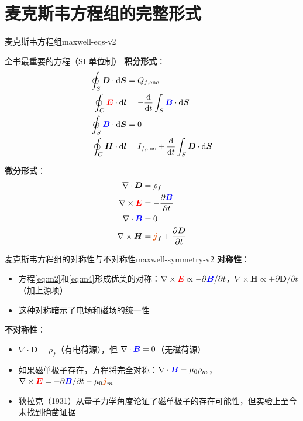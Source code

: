 \documentclass[11pt,a4paper,openany,oneside]{book}
\newcommand{\diff}{\mathrm{d}}
\newcommand{\vecE}{\textcolor{red}{\vect{E}}}
\newcommand{\vecB}{\textcolor{blue}{\vect{B}}}
\newcommand{\vecJ}{\textcolor{cororange}{\vect{j}}}
\newcommand{\vect}[1]{\bm{#1}}
\newcommand{\curl}{\nabla\times}
\newcommand{\divg}{\nabla\cdot}
\begin{document}
\section{麦克斯韦方程组的完整形式}

\begin{theorem}{麦克斯韦方程组}{maxwell-eqs-v2}
\begin{impEqbox}{全书最重要的方程（SI 单位制）}
\textbf{积分形式}：
\begin{align}
\oint_S \vect{D} \cdot \diff\vect{S} &= Q_{f,\text{enc}} \label{eq:M1} \\
\oint_C \vecE \cdot \diff\vect{l} &= -\frac{\diff}{\diff t}\int_S \vecB\cdot\diff\vect{S} \label{eq:M2} \\
\oint_S \vecB \cdot \diff\vect{S} &= 0 \label{eq:M3} \\
\oint_C \vect{H} \cdot \diff\vect{l} &= I_{f,\text{enc}} + \frac{\diff}{\diff t}\int_S \vect{D}\cdot\diff\vect{S} \label{eq:M4}
\end{align}

\textbf{微分形式}：
\begin{align}
\divg\vect{D} &= \rho_f \label{eq:m1} \\
\curl\vecE &= -\frac{\partial\vecB}{\partial t} \label{eq:m2} \\
\divg\vecB &= 0 \label{eq:m3} \\
\curl\vect{H} &= \vecJ_f + \frac{\partial\vect{D}}{\partial t} \label{eq:m4}
\end{align}
\end{impEqbox}
\end{theorem}

\begin{insight}{麦克斯韦方程组的对称性与不对称性}{maxwell-symmetry-v2}
\textbf{对称性}：
\begin{itemize}
\item 方程\eqref{eq:m2}和\eqref{eq:m4}形成优美的对称：$\curl\vecE \propto -\partial\vecB/\partial t$，$\curl\vect{H} \propto +\partial\vect{D}/\partial t$（加上源项）
\item 这种对称暗示了电场和磁场的统一性
\end{itemize}

\textbf{不对称性}：
\begin{itemize}
\item $\divg\vect{D} = \rho_f$（有电荷源），但 $\divg\vecB = 0$（无磁荷源）
\item 如果磁单极子存在，方程将完全对称：$\divg\vecB = \mu_0\rho_m$，$\curl\vecE = -\partial\vecB/\partial t - \mu_0\vecJ_m$
\item 狄拉克（1931）从量子力学角度论证了磁单极子的存在可能性，但实验上至今未找到确凿证据
\end{itemize}
\end{insight}
\end{document}
